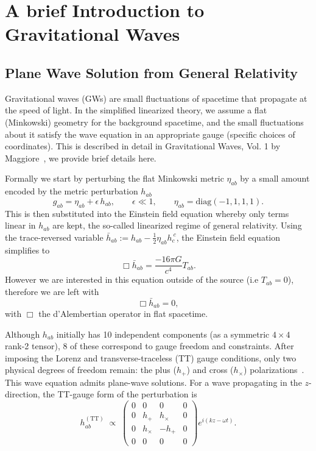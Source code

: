 \documentclass{ucdgradtaughtthesis}
\begin{document}
\tableofcontents
\listoffigures
\listoftables

\clearpage
{}
\pagestyle{fancy}


\chapter{A brief Introduction to Gravitational Waves}
\section{Plane Wave Solution from General Relativity}
\label{sec:GRintro}
Gravitational waves (GWs) are small fluctuations of spacetime that propagate at the speed of light. In the simplified linearized theory, we assume a flat (Minkowski) geometry for the background spacetime, and the small fluctuations about it satisfy the wave equation in an appropriate gauge (specific choices of coordinates). This is described in detail in Gravitational Waves, Vol. 1 by Maggiore~\cite[Sec~ 1.1]{GRbook}, we provide brief
details here.

Formally we start by perturbing the flat Minkowski metric $\eta _{a b}$ by a small amount encoded by
the metric perturbation $h_{a   b}$
\begin{equation}
g_{ab} = \eta_{ab} + \epsilon\,h_{ab},
\qquad
\epsilon \ll 1,
\qquad
\eta_{ab} = \mathrm{diag}(-1, 1, 1, 1).
\end{equation}
This is then substituted into the Einstein field equation whereby only terms linear in $h_{ab}$ are kept,
the so-called linearized regime of general relativity. 
Using the trace-reversed variable $\bar{h}_{ab}:= h_{ab}-\tfrac{1}{2} \eta_{ab} h_c^{\ c}$,
the Einstein field equation simplifies to
\begin{equation}
    \Box \bar{h}_{ab} = \frac{-16\pi G}{c^4} T_{ab}.
\end{equation}
However we are interested in this equation outside of the source (i.e $T_{ab} =0$), therefore we are left with 
\begin{equation}
    \Box \bar{h}_{ab} = 0, 
\end{equation}
with \(\Box\) the d’Alembertian operator in flat spacetime.
%

Although \(h_{ab}\) initially has 10 independent components (as a symmetric $4 \times 4$ rank-2 tensor), 8 of these correspond to gauge freedom and constraints. After imposing the Lorenz and transverse-traceless (TT) gauge conditions, only two physical degrees of freedom remain: the plus (\(h_+\)) and cross (\(h_\times\)) polarizations~\cite[Sec.~1.2]{GRbook}.
This wave equation admits plane-wave solutions. For a wave propagating in the \(z\)-direction, the TT-gauge form of the perturbation is
\begin{equation}
h_{ab}^{(\mathrm{TT})} \;\propto\;
\begin{pmatrix}
0 & 0 & 0 & 0 \\
0 & h_+ & h_\times & 0 \\
0 & h_\times & -h_+ & 0 \\
0 & 0 & 0 & 0
\end{pmatrix}
e^{i(kz-\omega t)}.
\end{equation}
\end{document}

